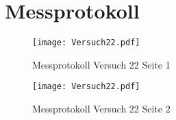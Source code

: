 
\section{Messprotokoll}
\begin{figure}[h!]
    \centering
    \texttt{[image: Versuch22.pdf]}
    \caption{Messprotokoll Versuch 22 Seite 1}
\end{figure}
\clearpage
\newpage
\begin{figure}[h!]
    \centering
    \texttt{[image: Versuch22.pdf]}
    \caption{Messprotokoll Versuch 22 Seite 2}
\end{figure}

\newpage